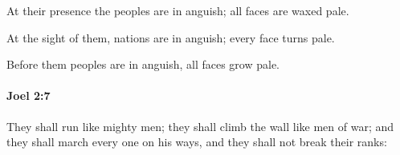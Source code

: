 			\begin{versebox}
					\item[BHS] 
					\item[LXX] 
					\item[ASV] At their presence the peoples are in anguish; all faces are waxed pale.
					\item[NIV] At the sight of them, nations are in anguish; every face turns pale.
					\item[NRSV] Before them peoples are in anguish, all faces grow pale.
			\end{versebox}

		\paragraph{Joel 2:7} %
			\label{JOEL-2-7}

			They shall run like mighty men; they shall climb the wall like men of war; and they shall march every one on his ways, and they shall not break their ranks:

